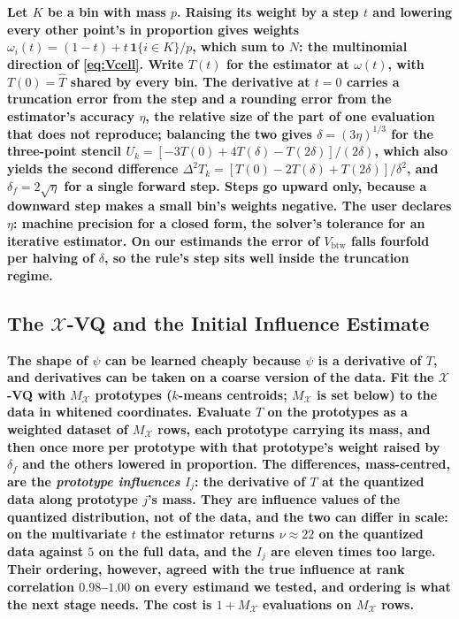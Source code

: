 \documentclass[runningheads]{llncs}
\newif\ifrev \revtrue
\newcommand{\rev}[1]{\ifrev{\color{blue}\bfseries #1}\else#1\fi}
\newcommand{\Vcell}{V_{\mathrm{btw}}}
\newcommand{\XVQ}{\ensuremath{\mathcal{X}}-VQ}
\newcommand{\MX}{M_{\mathcal{X}}}
\begin{document}
\rev{Let $K$ be a bin with mass $p$. Raising its weight by a step $t$ and lowering every other point's in proportion gives weights $\omega_i(t) = (1-t) + t\,\mathbf{1}\{i \in K\}/p$, which sum to $N$: the multinomial direction of \eqref{eq:Vcell}. Write $T(t)$ for the estimator at $\omega(t)$, with $T(0) = \hat T$ shared by every bin. The derivative at $t = 0$ carries a truncation error from the step and a rounding error from the estimator's accuracy $\eta$, the relative size of the part of one evaluation that does not reproduce; balancing the two gives $\delta = (3\eta)^{1/3}$ for the three-point stencil $U_k = [-3T(0) + 4T(\delta) - T(2\delta)]/(2\delta)$, which also yields the second difference $\Delta^2 T_k = [T(0) - 2T(\delta) + T(2\delta)]/\delta^2$, and $\delta_f = 2\sqrt{\eta}$ for a single forward step. Steps go upward only, because a downward step makes a small bin's weights negative. The user declares $\eta$: machine precision for a closed form, the solver's tolerance for an iterative estimator. On our estimands the error of $\Vcell$ falls fourfold per halving of $\delta$, so the rule's step sits well inside the truncation regime.}

\subsection{The $\mathcal{X}$-VQ and the Initial Influence Estimate}\label{sec:xvq}

\rev{The shape of $\psi$ can be learned cheaply because $\psi$ is a derivative of $T$, and derivatives can be taken on a coarse version of the data. Fit the \XVQ{} with $\MX$ prototypes ($k$-means centroids; $\MX$ is set below) to the data in whitened coordinates. Evaluate $T$ on the prototypes as a weighted dataset of $\MX$ rows, each prototype carrying its mass, and then once more per prototype with that prototype's weight raised by $\delta_f$ and the others lowered in proportion. The differences, mass-centred, are the \emph{prototype influences} $I_j$: the derivative of $T$ at the quantized data along prototype $j$'s mass. They are influence values of the quantized distribution, not of the data, and the two can differ in scale: on the multivariate $t$ the estimator returns $\nu \approx 22$ on the quantized data against $5$ on the full data, and the $I_j$ are eleven times too large. Their ordering, however, agreed with the true influence at rank correlation $0.98$--$1.00$ on every estimand we tested, and ordering is what the next stage needs. The cost is $1 + \MX$ evaluations on $\MX$ rows.}
\end{document}
